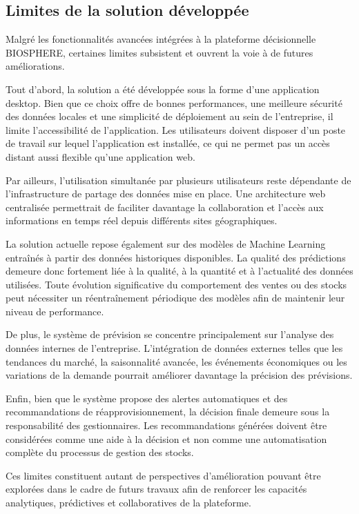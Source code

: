 \subsection{Limites de la solution développée}

Malgré les fonctionnalités avancées intégrées à la plateforme décisionnelle BIOSPHERE, certaines limites subsistent et ouvrent la voie à de futures améliorations.

Tout d'abord, la solution a été développée sous la forme d'une application desktop. Bien que ce choix offre de bonnes performances, une meilleure sécurité des données locales et une simplicité de déploiement au sein de l'entreprise, il limite l'accessibilité de l'application. Les utilisateurs doivent disposer d'un poste de travail sur lequel l'application est installée, ce qui ne permet pas un accès distant aussi flexible qu'une application web.

Par ailleurs, l'utilisation simultanée par plusieurs utilisateurs reste dépendante de l'infrastructure de partage des données mise en place. Une architecture web centralisée permettrait de faciliter davantage la collaboration et l'accès aux informations en temps réel depuis différents sites géographiques.

La solution actuelle repose également sur des modèles de Machine Learning entraînés à partir des données historiques disponibles. La qualité des prédictions demeure donc fortement liée à la qualité, à la quantité et à l'actualité des données utilisées. Toute évolution significative du comportement des ventes ou des stocks peut nécessiter un réentraînement périodique des modèles afin de maintenir leur niveau de performance.

De plus, le système de prévision se concentre principalement sur l'analyse des données internes de l'entreprise. L'intégration de données externes telles que les tendances du marché, la saisonnalité avancée, les événements économiques ou les variations de la demande pourrait améliorer davantage la précision des prévisions.

Enfin, bien que le système propose des alertes automatiques et des recommandations de réapprovisionnement, la décision finale demeure sous la responsabilité des gestionnaires. Les recommandations générées doivent être considérées comme une aide à la décision et non comme une automatisation complète du processus de gestion des stocks.

Ces limites constituent autant de perspectives d'amélioration pouvant être explorées dans le cadre de futurs travaux afin de renforcer les capacités analytiques, prédictives et collaboratives de la plateforme.

